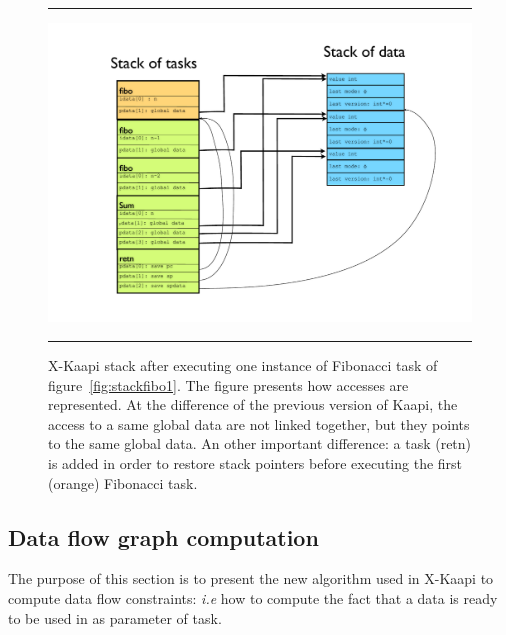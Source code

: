 \documentclass[12pt]{report}
\newcommand{\kaapi}{\textsc{X}-Kaapi\xspace}
\begin{document}
\begin{figure}[!h]
\hrule
\hspace*{-5ex}
\begin{minipage}[t]{1\linewidth}
\begin{center}
\includegraphics[width=1.0\linewidth]{stackfibo2}
\end{center}
\end{minipage}
\hrule
\caption{\kaapi stack after executing one instance of Fibonacci task of figure~\ref{fig:stackfibo1}.
The figure presents how accesses are represented. At the difference of the previous version of Kaapi,
the access to a same global data are not linked together, but they points to the same global data.
An other important difference: a task (retn) is added in order to restore stack pointers before executing the first (orange)  Fibonacci task.
}
\label{fig:stackfibo2}
\end{figure}


\newpage
\subsection{Data flow graph computation}
The purpose of this section is to present the new algorithm used in \kaapi to compute data flow constraints: \textit{i.e} how to compute the fact that a data is ready to be used in as parameter of task.
\end{document}
